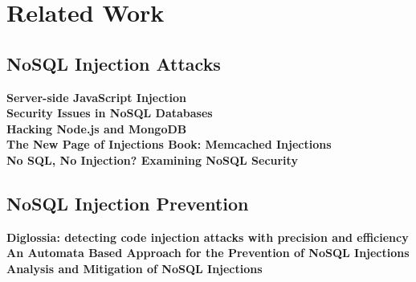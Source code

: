 \chapter{Related Work}

\section{NoSQL Injection Attacks}

\textbf{Server-side JavaScript Injection} \cite{Sullivan:2011} \\

\textbf{Security Issues in NoSQL Databases} \cite{Okman:2011} \\

\textbf{Hacking Node.js and MongoDB} \cite{Petkov:2014a, Petkov:2014b} \\

\textbf{The New Page of Injections Book: Memcached Injections} \cite{Novikov:2014} \\

\textbf{No SQL, No Injection? Examining NoSQL Security} \cite{Ron:2015} \\


\section{NoSQL Injection Prevention}

\textbf{Diglossia: detecting code injection attacks with precision and efficiency} \cite{Son:2013} \\

\textbf{An Automata Based Approach for the Prevention of NoSQL Injections} \cite{Joseph:2015} \\

\textbf{Analysis and Mitigation of NoSQL Injections} \cite{Ron:2016} \\